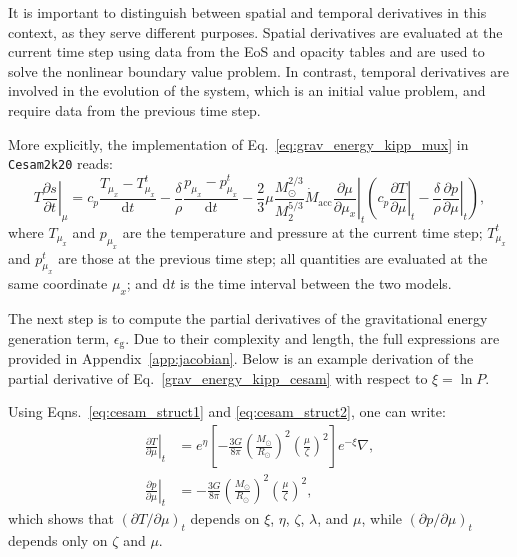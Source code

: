 \documentclass[12pt,a4paper]{article}
\newcommand{\mr}{\mathrm}
\newcommand{\pfird}[2][]{\frac{\partial#1}{\partial#2}}
\newcommand{\dd}[1]{\mathrm{d}#1}
\begin{document}
It is important to distinguish between spatial and temporal derivatives in this context, as they serve different purposes. Spatial derivatives are evaluated at the current time step using data from the EoS and opacity tables and are used to solve the nonlinear boundary value problem. In contrast, temporal derivatives are involved in the evolution of the system, which is an initial value problem, and require data from the previous time step.

More explicitly, the implementation of Eq.~\eqref{eq:grav_energy_kipp_mux} in \texttt{Cesam2k20} reads:
\begin{equation}
  T\left.\pfird[s]{t}\right|_\mu = c_p\frac{T_{\mu_x} - T_{\mu_x}^t}{\dd{t}} - \frac{\delta}{\rho}\frac{p_{\mu_x} - p_{\mu_x}^t}{\dd{t}} - \frac{2}{3}\mu\frac{M_\odot^{2/3}}{M_2^{5/3}}\dot{M}_\mr{acc}\left.\pfird[\mu]{\mu_x}\right|_t\left(c_p\left.\pfird[T]{\mu}\right|_t - \frac{\delta}{\rho}\left.\pfird[p]{\mu}\right|_t\right), \label{eq:grav_energy_kipp_cesam}
\end{equation}
where $T_{\mu_x}$ and $p_{\mu_x}$ are the temperature and pressure at the current time step; $T_{\mu_x}^t$ and $p_{\mu_x}^t$ are those at the previous time step; all quantities are evaluated at the same coordinate $\mu_x$; and $\dd{t}$ is the time interval between the two models. 

The next step is to compute the partial derivatives of the gravitational energy generation term, $\epsilon_\mr{g}$. Due to their complexity and length, the full expressions are provided in Appendix~\ref{app:jacobian}. Below is an example derivation of the partial derivative of Eq.~\eqref{grav_energy_kipp_cesam} with respect to $\xi = \ln P$.

Using Eqns.~\eqref{eq:cesam_struct1} and \eqref{eq:cesam_struct2}, one can write: 
\begin{align}
  \left.\pfird[T]{\mu}\right|_t &= e^\eta\left[-\frac{3G}{8\pi}\left(\frac{M_\odot}{R_\odot}\right)^2\left(\frac{\mu}{\zeta}\right)^2\right]e^{-\xi}\nabla,\\
  \left.\pfird[p]{\mu}\right|_t &= -\frac{3G}{8\pi}\left(\frac{M_\odot}{R_\odot}\right)^2\left(\frac{\mu}{\zeta}\right)^2,
\end{align}
which shows that $\left(\partial T/\partial \mu\right)_t$ depends on $\xi$, $\eta$, $\zeta$, $\lambda$, and $\mu$, while $\left(\partial p/\partial \mu\right)_t$ depends only on $\zeta$ and $\mu$.
\end{document}

